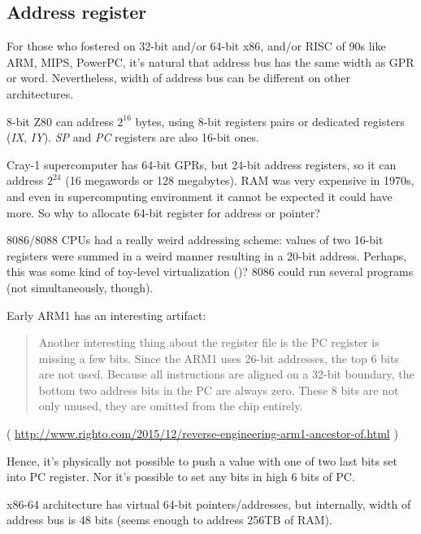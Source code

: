 \subsection{Address register}

For those who fostered on 32-bit and/or 64-bit x86, and/or RISC of 90s like ARM, MIPS, PowerPC, it's natural that
address bus has the same width as \ac{GPR} or \gls{word}.
Nevertheless, width of address bus can be different on other architectures.

8-bit Z80 can address $2^{16}$ bytes, using 8-bit registers pairs or dedicated registers (\emph{IX}, \emph{IY}).
\emph{SP} and \emph{PC} registers are also 16-bit ones.

Cray-1 supercomputer has 64-bit GPRs, but 24-bit address registers, so it can address $2^{24}$ 
(16 megawords or 128 megabytes).
RAM was very expensive in 1970s, and even in supercomputing environment it cannot be expected it could have more.
So why to allocate 64-bit register for address or pointer?

8086/8088 CPUs had a really weird addressing scheme:
values of two 16-bit registers were summed in a weird manner resulting in a 20-bit address.
Perhaps, this was some kind of toy-level virtualization ()?
8086 could run several programs (not simultaneously, though).

Early ARM1 has an interesting artifact:

\begin{framed}
\begin{quotation}
Another interesting thing about the register file is the PC register is missing a few bits. Since the ARM1 uses 26-bit addresses, the top 6 bits are not used. Because all instructions are aligned on a 32-bit boundary, the bottom two address bits in the PC are always zero. These 8 bits are not only unused, they are omitted from the chip entirely.
\end{quotation}
\end{framed}

( \url{http://www.righto.com/2015/12/reverse-engineering-arm1-ancestor-of.html} )

Hence, it's physically not possible to push a value with one of two last bits set into PC register.
Nor it's possible to set any bits in high 6 bits of PC.

x86-64 architecture has virtual 64-bit pointers/addresses, but internally, width of address bus is 48 bits
(seems enough to address 256TB of \ac{RAM}).

